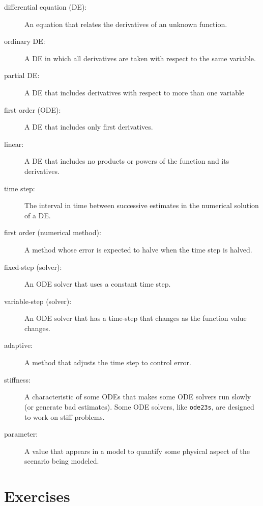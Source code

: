 \begin{description}

\item[differential equation (DE):] An equation that relates the
derivatives of an unknown function.

\item[ordinary DE:] A DE in which all derivatives are taken with
respect to the same variable.

\item[partial DE:] A DE that includes derivatives with respect to
more than one variable

\item[first order (ODE):] A DE that includes only first derivatives.

\item[linear:] A DE that includes no products or powers of the
function and its derivatives.

\item[time step:] The interval in time between successive estimates
in the numerical solution of a DE.

\item[first order (numerical method):] A method whose error is expected
to halve when the time step is halved.

\item[fixed-step (solver):] An ODE solver that uses a constant
time step.

\item[variable-step (solver):] An ODE solver that has a time-step that changes
as the function value changes.

\item[adaptive:] A method that adjusts the time step to control error.

\item[stiffness:] A characteristic of some ODEs that makes some ODE
solvers run slowly (or generate bad estimates). Some ODE solvers,
like {\tt ode23s}, are designed to work on stiff problems.

\item[parameter:] A value that appears in a model to quantify some
physical aspect of the scenario being modeled.

\end{description}

\section{Exercises}

